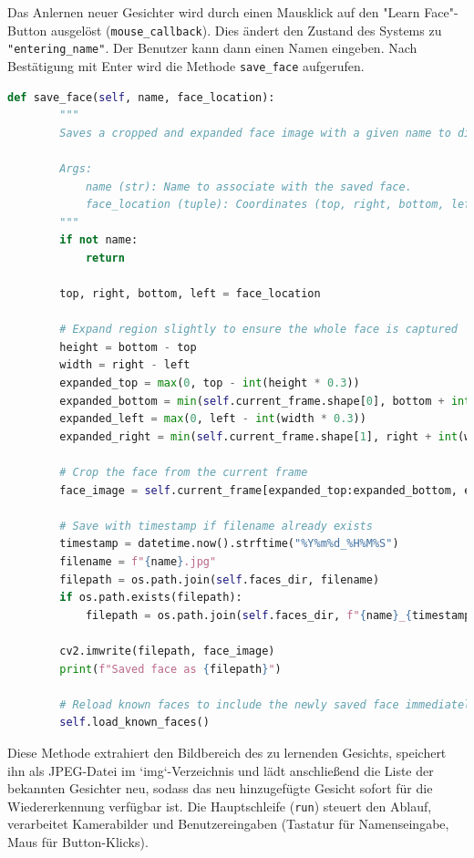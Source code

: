 Das Anlernen neuer Gesichter wird durch einen Mausklick auf den "Learn Face"-Button ausgelöst (\texttt{mouse\_callback}). Dies ändert den Zustand des Systems zu \texttt{"entering\_name"}. Der Benutzer kann dann einen Namen eingeben. Nach Bestätigung mit Enter wird die Methode \texttt{save\_face} aufgerufen.

\begin{lstlisting}[language=Python, caption={Speichern eines neuen Gesichts}, label={lst:yolo_save}, inputencoding=utf8]
    def save_face(self, name, face_location):
        """
        Saves a cropped and expanded face image with a given name to disk.

        Args:
            name (str): Name to associate with the saved face.
            face_location (tuple): Coordinates (top, right, bottom, left) of the face.
        """
        if not name:
            return

        top, right, bottom, left = face_location

        # Expand region slightly to ensure the whole face is captured
        height = bottom - top
        width = right - left
        expanded_top = max(0, top - int(height * 0.3))
        expanded_bottom = min(self.current_frame.shape[0], bottom + int(height * 0.3))
        expanded_left = max(0, left - int(width * 0.3))
        expanded_right = min(self.current_frame.shape[1], right + int(width * 0.3))

        # Crop the face from the current frame
        face_image = self.current_frame[expanded_top:expanded_bottom, expanded_left:expanded_right]

        # Save with timestamp if filename already exists
        timestamp = datetime.now().strftime("%Y%m%d_%H%M%S")
        filename = f"{name}.jpg"
        filepath = os.path.join(self.faces_dir, filename)
        if os.path.exists(filepath):
            filepath = os.path.join(self.faces_dir, f"{name}_{timestamp}.jpg")

        cv2.imwrite(filepath, face_image)
        print(f"Saved face as {filepath}")

        # Reload known faces to include the newly saved face immediately
        self.load_known_faces()
\end{lstlisting}
Diese Methode extrahiert den Bildbereich des zu lernenden Gesichts, speichert ihn als JPEG-Datei im `img`-Verzeichnis und lädt anschließend die Liste der bekannten Gesichter neu, sodass das neu hinzugefügte Gesicht sofort für die Wiedererkennung verfügbar ist. Die Hauptschleife (\texttt{run}) steuert den Ablauf, verarbeitet Kamerabilder und Benutzereingaben (Tastatur für Namenseingabe, Maus für Button-Klicks).



